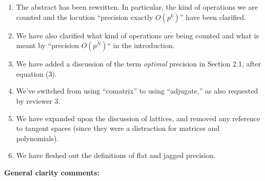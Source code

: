 \documentclass{article}
\newcommand{\done}[1]{#1}
\begin{document}
\begin{enumerate}
\item \done{The abstract has been rewritten. In particular, the kind of operations we are counted and the locution ``precision exactly $O(p^k)$'' have been clarified.}
\item \done{We have also clarified what kind of operations are being counted and what is meant by ``precision $O(p^N)$`` in the introduction.}
\item \done{We have added a discussion of the term \emph{optimal} precision in Section 2.1, after equation (3).}
\item \done{We've switched from using ``comatrix'' to using ``adjugate,'' as also requested by reviewer 3.}
\item \done{We have expanded upon the discussion of lattices, and removed any reference to tangent spaces (since they were a distraction for matrices and polynomials).}
\item \done{We have fleshed out the definitions of flat and jagged precision.}
\end{enumerate}
\textbf{General clarity comments:}
\end{document}
